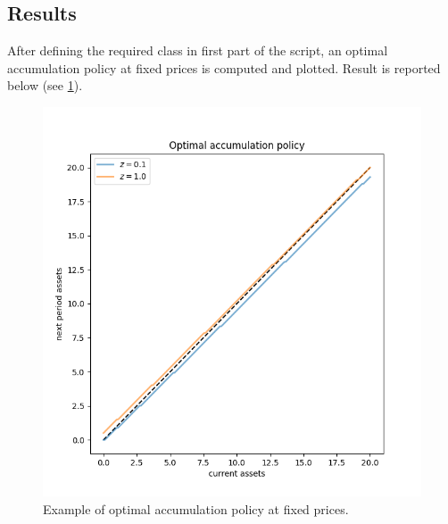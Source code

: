\documentclass[12pt]{article}
\begin{document}
\subsection{Results}
After defining the required class in first part of the script, an optimal accumulation policy at fixed prices is computed and plotted. Result is reported below (see \ref{plot:policy}).  \\ 
\begin{figure}[]
\label{plot:policy}
\centering
\includegraphics[scale = 0.8]{accumulation_policy.png}
\caption{Example of optimal accumulation policy at fixed prices.}
\end{figure}
\end{document}
